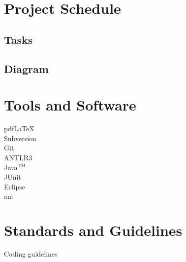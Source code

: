 \chapter{Project Schedule}
\section{Tasks}

\section{Diagram}
\begin{gantt}[xunitlength=0.7cm]{12}{16}
  \begin{ganttitle}
  \end{ganttitle}
\end{gantt}

\chapter{Tools and Software}
\begin{description}
  \item[pdf\LaTeX] 
  \item[Subversion]
  \item[Git]
  \item[ANTLR3]
  \item[Java$^{\textrm{TM}}$]
  \item[JUnit]
  \item[Eclipse]
  \item[ant]
\end{description}

\chapter{Standards and Guidelines}
Coding guidelines

